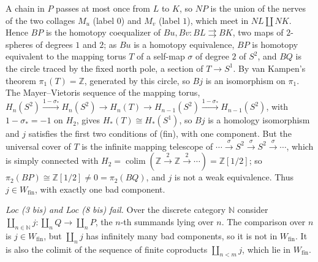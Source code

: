 \documentclass[11pt,a4paper]{article}
\theoremstyle{definition}
\newcommand{\Wfin}{W_{\mathrm{fin}}}
\newcommand{\Z}{\mathbb{Z}}
\newcommand{\N}{\mathbb{N}}
\newcommand{\colim}{\operatorname*{colim}}
\begin{document}
A chain in $P$ passes at most once from $L$ to $K$, so $NP$ is the union of the nerves of the
two collages $M_u$ (label $0$) and $M_v$ (label $1$), which meet in $NL\amalg NK$. Hence $BP$ is
the homotopy coequalizer of $Bu,Bv\colon BL\rightrightarrows BK$, two maps of $2$-spheres of
degrees $1$ and $2$; as $Bu$ is a homotopy equivalence, $BP$ is homotopy equivalent to the
mapping torus $T$ of a self-map $\sigma$ of degree $2$ of $S^2$, and $BQ$ is the circle traced
by the fixed north pole, a section of $T\to S^1$. By van Kampen's theorem $\pi_1(T)=\Z$,
generated by this circle, so $Bj$ is an isomorphism on $\pi_1$. The Mayer--Vietoris sequence of
the mapping torus, $H_n(S^2)\xrightarrow{1-\sigma_*}H_n(S^2)\to H_n(T)\to H_{n-1}(S^2)
\xrightarrow{1-\sigma_*}H_{n-1}(S^2)$, with $1-\sigma_*=-1$ on $H_2$, gives $H_*(T)\cong
H_*(S^1)$, so $Bj$ is a homology isomorphism and $j$ satisfies the first two conditions of
(fin), with one component. But the universal cover of $T$ is the infinite mapping telescope of
$\cdots\xrightarrow{\sigma}S^2\xrightarrow{\sigma}S^2\xrightarrow{\sigma}\cdots$, which is simply
connected with $H_2=\colim(\Z\xrightarrow{2}\Z\xrightarrow{2}\cdots)=\Z[1/2]$; so
$\pi_2(BP)\cong\Z[1/2]\ne0=\pi_2(BQ)$, and $j$ is not a weak equivalence. Thus $j\in\Wfin$,
with exactly one bad component.

\emph{Loc (3 bis) and Loc (8 bis) fail.} Over the discrete category $\N$ consider
$\coprod_{n\in\N}j\colon\coprod_{n}Q\to\coprod_nP$, the $n$-th summands lying over $n$. The
comparison over $n$ is $j\in\Wfin$, but $\coprod_nj$ has infinitely many bad components, so it is
not in $\Wfin$. It is also the colimit of the sequence of finite coproducts $\coprod_{n<m}j$,
which lie in $\Wfin$.
\end{document}
